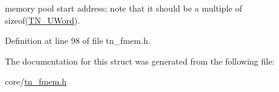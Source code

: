 memory pool start address; note that it should be a multiple of {\ttfamily sizeof(\hyperlink{tn__arch__example_8h_ab80cba0fe9ffcd9011d53dfeb9e39bf4}{T\+N\+\_\+\+U\+Word})}. 



Definition at line 98 of file tn\+\_\+fmem.\+h.



The documentation for this struct was generated from the following file\+:\begin{DoxyCompactItemize}
\item 
core/\hyperlink{tn__fmem_8h}{tn\+\_\+fmem.\+h}\end{DoxyCompactItemize}
